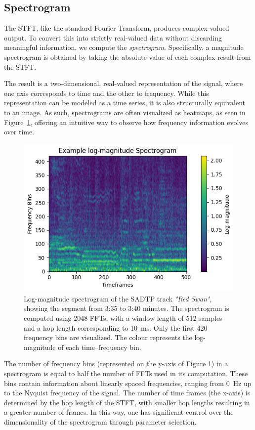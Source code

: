 \subsection{Spectrogram}

The \gls{STFT}, like the standard Fourier Transform, produces complex-valued output. To convert this into strictly real-valued data without discarding meaningful information, we compute the \textit{spectrogram}. Specifically, a magnitude spectrogram is obtained by taking the absolute value of each complex result from the \gls{STFT}.

The result is a two-dimensional, real-valued representation of the signal, where one axis corresponds to time and the other to frequency. While this representation can be modeled as a time series, it is also structurally equivalent to an image. As such, spectrograms are often visualized as heatmaps, as seen in Figure~\ref{SpectrogramFigure}, offering an intuitive way to observe how frequency information evolves over time.

\begin{figure}[H]
    \centering
    \includegraphics[scale=1.1]{figures/logspectrogram}
    \caption{Log-magnitude spectrogram of the SADTP track \textit{"Red Swan"}, showing the segment from 3:35 to 3:40 minutes. The spectrogram is computed using 2048 \glspl{FFT}, with a window length of 512 samples and a hop length corresponding to 10~ms. Only the first 420 frequency bins are visualized. The colour represents the log-magnitude of each time–frequency bin.}
    \label{SpectrogramFigure}
\end{figure}

The number of frequency bins (represented on the y-axis of Figure \ref{SpectrogramFigure}) in a spectrogram is equal to half the number of \glspl{FFT} used in its computation. These bins contain information about linearly spaced frequencies, ranging from 0~Hz up to the Nyquist frequency of the signal. The number of time frames (the x-axis) is determined by the hop length of the \gls{STFT}, with smaller hop lengths resulting in a greater number of frames. In this way, one has significant control over the dimensionality of the spectrogram through parameter selection. 

